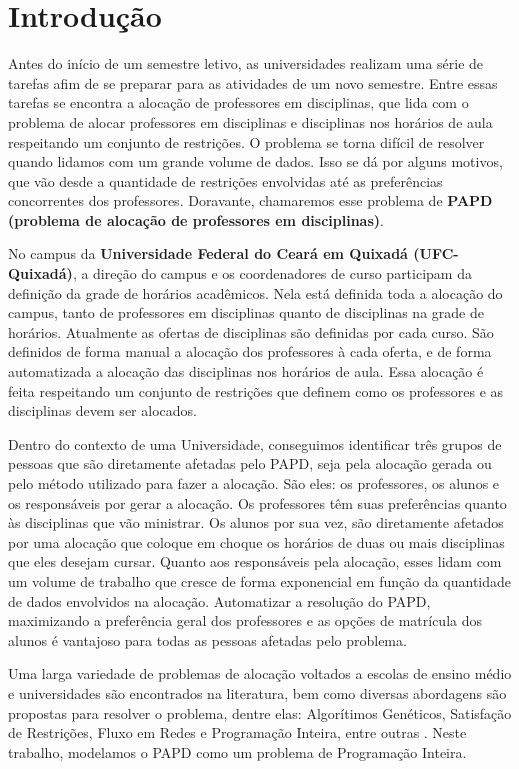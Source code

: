 \chapter{Introdução}
\label{introducao}

Antes do início de um semestre letivo, as universidades realizam uma série de tarefas afim de se preparar para as atividades de um novo semestre. Entre essas tarefas se encontra a alocação de professores em disciplinas, que lida com o problema de alocar professores em disciplinas e disciplinas nos horários de aula respeitando um conjunto de restrições. O problema se torna difícil de resolver quando lidamos com um grande volume de dados. Isso se dá por alguns motivos, que vão desde a quantidade de restrições envolvidas até as preferências concorrentes dos professores. Doravante, chamaremos esse problema de \textbf{PAPD (problema de alocação de professores em disciplinas)}.

No campus da \textbf{Universidade Federal do Ceará em Quixadá (UFC-Quixadá)}, a direção do campus e os coordenadores de curso participam da definição da grade de horários acadêmicos. Nela está definida toda a alocação do campus, tanto de professores em disciplinas quanto de disciplinas na grade de horários. Atualmente as ofertas de disciplinas são definidas por cada curso. São definidos de forma manual a alocação dos professores à cada oferta, e de forma automatizada a alocação das disciplinas nos horários de aula. Essa alocação é feita respeitando um conjunto de restrições que definem como os professores e as disciplinas devem ser alocados.

Dentro do contexto de uma Universidade, conseguimos identificar três grupos de pessoas que são diretamente afetadas pelo PAPD, seja pela alocação gerada ou pelo método utilizado para fazer a alocação. São eles: os professores, os alunos e os responsáveis por gerar a alocação. Os professores têm suas preferências quanto às disciplinas que vão ministrar. Os alunos por sua vez, são diretamente afetados por uma alocação que coloque em choque os horários de duas ou mais disciplinas que eles desejam cursar. Quanto aos responsáveis pela alocação, esses lidam com um volume de trabalho que cresce de forma exponencial em função da quantidade de dados envolvidos na alocação. Automatizar a resolução do PAPD, maximizando a preferência geral dos professores e as opções de matrícula dos alunos é vantajoso para todas as pessoas afetadas pelo problema.

Uma larga variedade de problemas de alocação voltados a escolas de ensino médio e universidades são encontrados na literatura, bem como diversas abordagens são propostas para resolver o problema, dentre elas: Algorítimos Genéticos, Satisfação de Restrições, Fluxo em Redes e Programação Inteira, entre outras \cite{schaerf1999survey}. Neste trabalho, modelamos o PAPD como um problema de Programação Inteira. 


